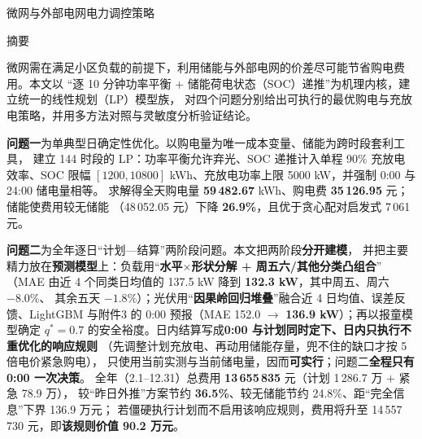 \documentclass[12pt,a4paper,fontset=fandol]{ctexart}
\begin{document}
\begin{center}{\heiti 微网与外部电网电力调控策略}\end{center}

\vspace{0.5em}

\begin{center}{\heiti 摘\quad 要}\end{center}

微网需在满足小区负载的前提下\nobreak，利用储能与外部电网的价差尽可能节省购电费用\nobreak。本文以
“逐 10 分钟功率平衡 + 储能荷电状态（SOC\nobreak）递推\nobreak”为机理内核\nobreak，建立统一的线性规划（LP\nobreak）模型族\nobreak，
对四个问题分别给出可执行的最优购电与充放电策略\nobreak，并用多方法对照与灵敏度分析验证结论\nobreak。

\textbf{问题一}为单典型日确定性优化\nobreak。以购电量为唯一成本变量\nobreak、储能为跨时段套利工具\nobreak，
建立 144 时段的 LP\nobreak：功率平衡允许弃光\nobreak、SOC 递推计入单程 90\% 充放电效率\nobreak、SOC 限幅
$[1200,10800]$ kWh\nobreak、充放电功率上限 5000 kW\nobreak，并强制 0:00 与 24:00 储电量相等\nobreak。
求解得全天购电量 \textbf{59\,482.67} kWh\nobreak、购电费 \textbf{35\,126.95} 元\nobreak；储能使费用较无储能
（48\,052.05 元\nobreak）下降 \textbf{26.9\%}\nobreak，且优于贪心配对启发式 7\,061 元\nobreak。

\textbf{问题二}为全年逐日“计划—结算\nobreak”两阶段问题\nobreak。本文把两阶段\textbf{分开建模}\nobreak，
并把主要精力放在\textbf{预测模型}上\nobreak：负载用“\textbf{水平$\times$形状分解 + 周五六/其他分类凸组合}\nobreak”
（MAE 由近 4 个同类日均值的 137.5 kW 降到 \textbf{132.3 kW}\nobreak，其中周五\nobreak、周六 $-8.0\%$\nobreak、
其余五天 $-1.8\%$\nobreak）\nobreak；光伏用“\textbf{因果岭回归堆叠}\nobreak”融合近 4 日均值\nobreak、误差反馈\nobreak、LightGBM
与附件3 的 0:00 预报（MAE 152.0 $\to$ \textbf{136.9 kW}\nobreak）\nobreak；再以报童模型确定
$q^*=0.7$ 的安全裕度\nobreak。日内结算写成\textbf{0:00 与计划同时定下\nobreak、日内只执行不重优化的响应规则}
（先调整计划充放电\nobreak、再动用储能存量\nobreak，兜不住的缺口才按 5 倍电价紧急购电\nobreak）\nobreak，
只使用当前实测与当前储电量\nobreak，因而\textbf{可实行}\nobreak；问题二\textbf{全程只有 0:00 一次决策}\nobreak。
全年（2.1--12.31\nobreak）总费用 \textbf{13\,655\,835} 元（计划 1\,286.7 万 $+$ 紧急 78.9 万\nobreak）\nobreak，
较“昨日外推\nobreak”方案节约 \textbf{36.5\%}\nobreak、较无储能节约 24.8\%\nobreak、距“完全信息\nobreak”下界 136.9 万元\nobreak；
若僵硬执行计划而不启用该响应规则\nobreak，费用将升至 14\,557\,730 元\nobreak，即\textbf{该规则价值 90.2 万元}\nobreak。
\end{document}

